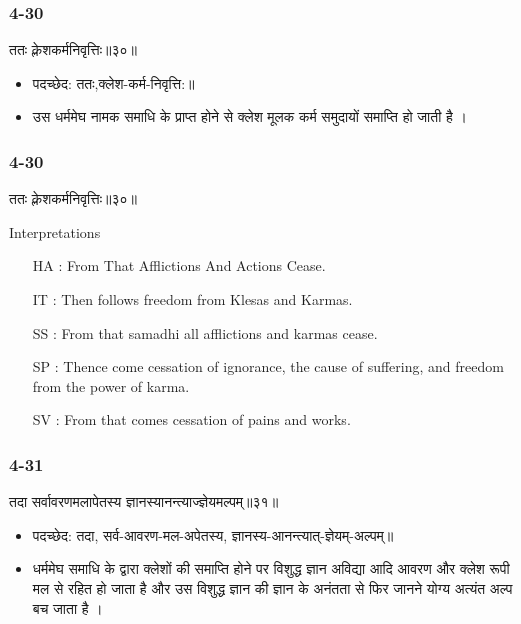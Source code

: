 \begin{frame}[fragile]\frametitle{4-30}
\begin{sanskrit}
ततः क्लेशकर्मनिवृत्तिः॥३०॥
\end{sanskrit}

\begin{itemize}
\item पदच्छेद:  ततः,क्लेश-कर्म-निवृत्ति:‌॥
\item  उस धर्ममेघ नामक समाधि के प्राप्त होने से क्लेश मूलक कर्म समुदायों समाप्ति हो जाती है ।
\end{itemize}
\end{frame}


\begin{frame}[fragile]\frametitle{4-30}
\begin{sanskrit}
ततः क्लेशकर्मनिवृत्तिः॥३०॥
\end{sanskrit}

Interpretations
\begin{itemize}	
\item [HA]: From That Afflictions And Actions Cease.
\item [IT]: Then follows freedom from Klesas and Karmas.
\item [SS]: From that samadhi all afflictions and karmas cease.
\item [SP]: Thence come cessation of ignorance, the cause of suffering, and freedom from the power of karma.
\item [SV]: From that comes cessation of pains and works. 
\end{itemize}
\end{frame}

\begin{frame}[fragile]\frametitle{4-31}
\begin{sanskrit}
तदा सर्वावरणमलापेतस्य ज्ञानस्यानन्त्याज्ज्ञेयमल्पम्॥३१॥
\end{sanskrit}

\begin{itemize}
\item पदच्छेद:  तदा, सर्व-आवरण-मल-अपेतस्य, ज्ञानस्य-आनन्त्यात्-ज्ञेयम्-अल्पम्॥
\item धर्ममेघ समाधि के द्वारा क्लेशों की समाप्ति होने पर विशुद्ध ज्ञान अविद्या आदि आवरण और क्लेश रूपी मल से रहित हो जाता है और उस विशुद्ध ज्ञान की ज्ञान के अनंतता से फिर जानने योग्य अत्यंत अल्प बच जाता है ।
\end{itemize}
\end{frame}


